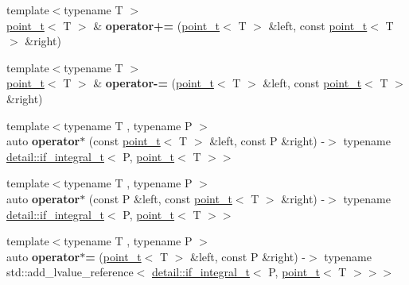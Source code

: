 \begin{DoxyCompactItemize}
\mbox{\label{namespacetwod_ad944419ff4062d3226c07802721d6aa6}} 
{\footnotesize template$<$typename T $>$ }\\\hyperlink{structtwod_1_1point__t}{point\+\_\+t}$<$ T $>$ \& {\bfseries operator+=} (\hyperlink{structtwod_1_1point__t}{point\+\_\+t}$<$ T $>$ \&left, const \hyperlink{structtwod_1_1point__t}{point\+\_\+t}$<$ T $>$ \&right)
\item 
\mbox{\label{namespacetwod_a02a9d3909e1563400e24f5d089516ae5}} 
{\footnotesize template$<$typename T $>$ }\\\hyperlink{structtwod_1_1point__t}{point\+\_\+t}$<$ T $>$ \& {\bfseries operator-\/=} (\hyperlink{structtwod_1_1point__t}{point\+\_\+t}$<$ T $>$ \&left, const \hyperlink{structtwod_1_1point__t}{point\+\_\+t}$<$ T $>$ \&right)
\item 
\mbox{\label{namespacetwod_aadf0fb420b14beef024cb4f18a79ebae}} 
{\footnotesize template$<$typename T , typename P $>$ }\\auto {\bfseries operator$\ast$} (const \hyperlink{structtwod_1_1point__t}{point\+\_\+t}$<$ T $>$ \&left, const P \&right) -\/$>$ typename \hyperlink{namespacetwod_1_1detail_a594c4b9cf396490f0ca5a324b0ef66db}{detail\+::if\+\_\+integral\+\_\+t}$<$ P, \hyperlink{structtwod_1_1point__t}{point\+\_\+t}$<$ T $>$$>$
\item 
\mbox{\label{namespacetwod_a884a2e6f23eea555a45f162f0e84ff86}} 
{\footnotesize template$<$typename T , typename P $>$ }\\auto {\bfseries operator$\ast$} (const P \&left, const \hyperlink{structtwod_1_1point__t}{point\+\_\+t}$<$ T $>$ \&right) -\/$>$ typename \hyperlink{namespacetwod_1_1detail_a594c4b9cf396490f0ca5a324b0ef66db}{detail\+::if\+\_\+integral\+\_\+t}$<$ P, \hyperlink{structtwod_1_1point__t}{point\+\_\+t}$<$ T $>$$>$
\item 
\mbox{\label{namespacetwod_a0f2bfa099a6c568ebbbb588700534dee}} 
{\footnotesize template$<$typename T , typename P $>$ }\\auto {\bfseries operator$\ast$=} (\hyperlink{structtwod_1_1point__t}{point\+\_\+t}$<$ T $>$ \&left, const P \&right) -\/$>$ typename std\+::add\+\_\+lvalue\+\_\+reference$<$ \hyperlink{namespacetwod_1_1detail_a594c4b9cf396490f0ca5a324b0ef66db}{detail\+::if\+\_\+integral\+\_\+t}$<$ P, \hyperlink{structtwod_1_1point__t}{point\+\_\+t}$<$ T $>$$>$$>$

\end{DoxyCompactItemize}
